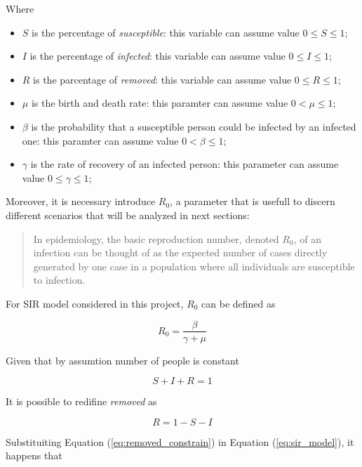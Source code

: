 Where
\begin{itemize}
    \item $S$ is the percentage of \textit{susceptible}: this variable can assume value $0 \leq S \leq 1$;
    \item $I$ is the percentage of \textit{infected}: this variable can assume value $0 \leq I \leq 1$;
    \item $R$ is the parcentage of \textit{removed}: this variable can assume value $0 \leq R \leq 1$;
    \item $\mu$ is the birth and death rate: this paramter can assume value $0 < \mu \leq 1$;
    \item $\beta$ is the probability that a susceptible person could be infected by an infected one: this paramter can assume value $0 < \beta \leq 1$;
    \item $\gamma$ is the rate of recovery of an infected person: this parameter can assume value $0 \leq \gamma \leq 1$;
\end{itemize}

Moreover, it is necessary introduce $R_0$, a parameter that is usefull to discern different scenarios that will be analyzed in next sections:
\begin{quote}
    In epidemiology, the basic reproduction number, denoted $R_0$, of an infection can be thought of as the expected number of cases directly generated by one case in a population where all individuals are susceptible to infection. \cite{bib:r0_definition}
\end{quote}

For SIR model considered in this project, $R_0$ can be defined as

\begin{equation}
    \label{eq:r0_definition}
    R_0 = \frac{\beta}{\gamma + \mu}
\end{equation}

Given that by assumtion number of people is constant

\begin{equation}
\label{eq:population_constraint}
    S + I + R = 1
\end{equation}

It is possible to redifine \textit{removed} as

\begin{equation}
\label{eq:removed_constrain}
    R = 1 - S - I
\end{equation}

Substituiting Equation (\ref{eq:removed_constrain}) in Equation (\ref{eq:sir_model}), it happens that

